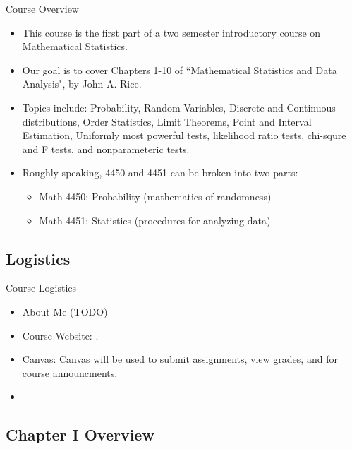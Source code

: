\begin{frame}{Course Overview}
  \begin{itemize}
  \item This course is the first part of a two semester introductory course on Mathematical Statistics.
  \item Our goal is to cover Chapters 1-10 of ``Mathematical Statistics and Data Analysis", by John A. Rice.
  \item Topics include: Probability, Random Variables, Discrete and Continuous distributions, Order Statistics, Limit Theorems, Point and Interval Estimation, Uniformly most powerful tests, likelihood ratio tests, chi-squre and F tests, and nonparameteric tests.
  \item Roughly speaking, 4450 and 4451 can be broken into two parts: 
  \begin{itemize}
    \item Math 4450: Probability (mathematics of randomness)
    \item Math 4451: Statistics (procedures for analyzing data)
  \end{itemize}
  \end{itemize}
\end{frame}

\subsection{Logistics}

\begin{frame}{Course Logistics}
  \begin{itemize}
    \item About Me (TODO)
    \item Course Website: . 
    \item Canvas: Canvas will be used to submit assignments, view grades, and for course announcments.
    \item {}
  \end{itemize}
\end{frame}

\subsection{Chapter I Overview}

